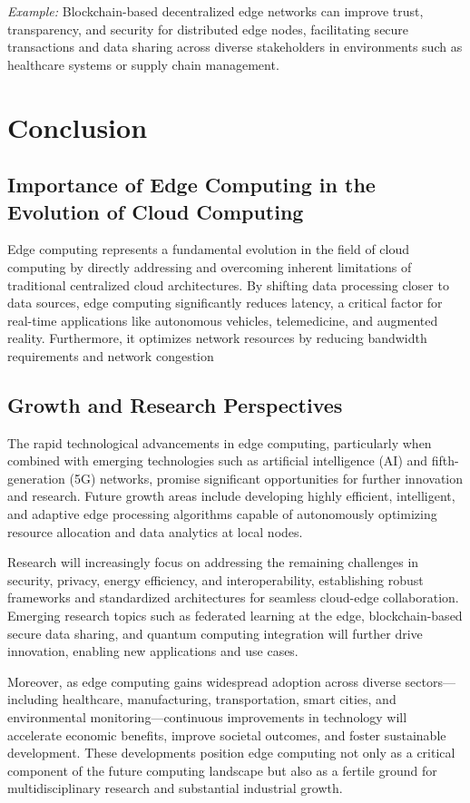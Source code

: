 \documentclass[runningheads]{llncs}
\begin{document}
\noindent\textit{Example:} Blockchain-based decentralized edge networks can improve trust, transparency, and security for distributed edge nodes, facilitating secure transactions and data sharing across diverse stakeholders in environments such as healthcare systems or supply chain management.

\section{Conclusion}
\subsection{Importance of Edge Computing in the Evolution of Cloud Computing}

Edge computing represents a fundamental evolution in the field of cloud computing by directly addressing and overcoming inherent limitations of traditional centralized cloud architectures. By shifting data processing closer to data sources, edge computing significantly reduces latency, a critical factor for real-time applications like autonomous vehicles, telemedicine, and augmented reality. Furthermore, it optimizes network resources by reducing bandwidth requirements and network congestion


\subsection{Growth and Research Perspectives}

The rapid technological advancements in edge computing, particularly when combined with emerging technologies such as artificial intelligence (AI) and fifth-generation (5G) networks, promise significant opportunities for further innovation and research. Future growth areas include developing highly efficient, intelligent, and adaptive edge processing algorithms capable of autonomously optimizing resource allocation and data analytics at local nodes.

Research will increasingly focus on addressing the remaining challenges in security, privacy, energy efficiency, and interoperability, establishing robust frameworks and standardized architectures for seamless cloud-edge collaboration. Emerging research topics such as federated learning at the edge, blockchain-based secure data sharing, and quantum computing integration will further drive innovation, enabling new applications and use cases.

Moreover, as edge computing gains widespread adoption across diverse sectors—
including healthcare, manufacturing, transportation, smart cities, and environmental monitoring—continuous improvements in technology will accelerate economic benefits, improve societal outcomes, and foster sustainable development. These developments position edge computing not only as a critical component of the future computing landscape but also as a fertile ground for multidisciplinary research and substantial industrial growth.
\end{document}
